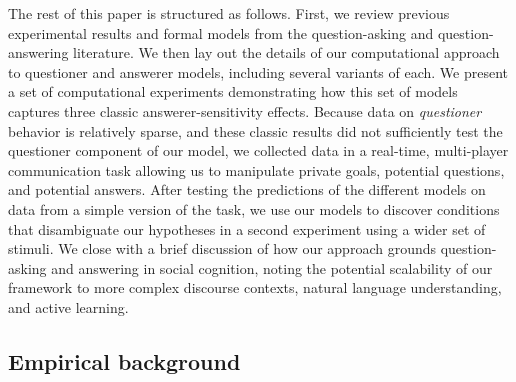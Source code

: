 \documentclass[12pt, floatsintext, jou]{apa6}
\begin{document}
%

The rest of this paper is structured as follows. First, we review previous experimental results and formal models from the question-asking and question-answering literature. We then lay out the details of our computational approach  to questioner and answerer models, including several variants of each. We present a set of computational experiments demonstrating how this set of models captures three classic answerer-sensitivity effects.
Because data on \emph{questioner} behavior is relatively sparse, and these classic results did not sufficiently test the questioner component of our model, we collected data in a real-time, multi-player communication task allowing us to manipulate private goals, potential questions, and potential answers. After testing the predictions of the different models on data from a simple version of the task, we use our models to discover conditions that disambiguate our hypotheses in a second experiment using a wider set of stimuli.
We close with a brief discussion of how our approach grounds question-asking and answering in social cognition, noting the potential scalability of our framework to more complex discourse contexts, natural language understanding, and active learning.


\subsection{Empirical background}
\end{document}
